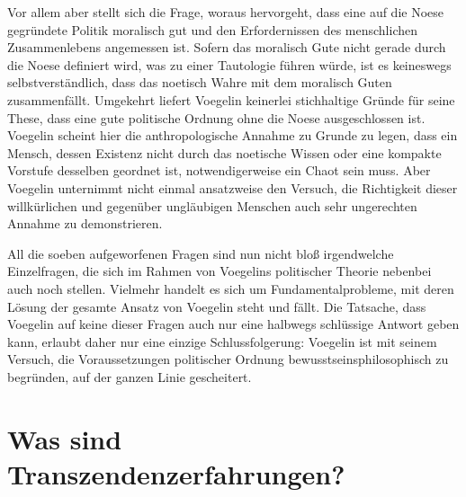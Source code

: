 
Vor allem aber stellt sich die Frage, woraus hervorgeht, dass eine auf die
Noese gegründete Politik moralisch gut und den Erfordernissen des menschlichen
Zusammenlebens angemessen ist. Sofern das moralisch Gute nicht gerade durch
die Noese definiert wird, was zu einer Tautologie führen würde, ist es
keineswegs selbstverständlich, dass das noetisch Wahre mit dem moralisch Guten
zusammenfällt. Umgekehrt liefert Voegelin keinerlei stichhaltige Gründe für
seine These, dass eine gute politische Ordnung ohne die Noese ausgeschlossen
ist. Voegelin scheint hier die anthropologische Annahme zu Grunde zu legen,
dass ein Mensch, dessen Existenz nicht durch das noetische Wissen oder eine
kompakte Vorstufe desselben geordnet ist, notwendigerweise ein Chaot sein
muss.  Aber Voegelin unternimmt nicht einmal ansatzweise den Versuch, die
Richtigkeit dieser willkürlichen und gegenüber ungläubigen Menschen auch sehr
ungerechten Annahme zu demonstrieren.

All die soeben aufgeworfenen Fragen sind nun nicht bloß irgendwelche
Einzelfragen, die sich im Rahmen von Voegelins politischer Theorie nebenbei
auch noch stellen. Vielmehr handelt es sich um Fundamentalprobleme, mit deren
Lösung der gesamte Ansatz von Voegelin steht und fällt. Die Tatsache, dass
Voegelin auf keine dieser Fragen auch nur eine halbwegs schlüssige Antwort
geben kann, erlaubt daher nur eine einzige Schlussfolgerung: Voegelin ist mit
seinem Versuch, die Voraussetzungen politischer Ordnung
bewusstseinsphilosophisch zu begründen, auf der ganzen Linie gescheitert.

\section{Was sind Transzendenzerfahrungen?}
\label{Transzendenzerfahrungen}


